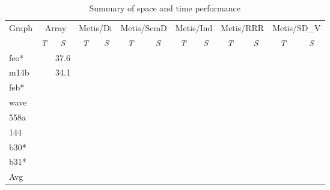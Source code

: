 \documentclass[12pt,glossary]{dalthesis}
\begin{document}
\begin{table}[]
\centering
\caption{Summary of space and time performance}
\label{my-label}
\begin{tabular}{|l||c|c||c|c||c|c||c|c||c|c||c|c|}
\hline
\multirow{2}{*}{Graph} & \multicolumn{2}{c||}{Array} & \multicolumn{2}{c||}{Metis/Di} & \multicolumn{2}{c||}{Metis/SemD} & \multicolumn{2}{c||}{Metis/Ind} & \multicolumn{2}{c||}{Metis/RRR} & \multicolumn{2}{c|}{Metis/SD\_V} \\ \cline{2-13}
                       & \textit{T}        & \textit{S}       & \textit{T}           & \textit{S}           & \textit{T} & \textit{S}          & \textit{T}            & \textit{S}           & \textit{T}          & \textit{S}        & \textit{T} & \textit{S} \\ \hline
feo*               &             & 37.6        &                &                 &               &                &                 &                  &               &               &                &                \\
m14b                   &             & 34.1        &                &                 &               &                &                 &                  &               &               &                &                \\
feb*               &             &             &                &                 &               &                &                 &                  &               &               &                &                \\
wave                   &             &             &                &                 &               &                &                 &                  &               &               &                &                \\
558a                   &             &             &                &                 &               &                &                 &                  &               &               &                &                \\
144                    &             &             &                &                 &               &                &                 &                  &               &               &                &                \\
b30*               &             &             &                &                 &               &                &                 &                  &               &               &                &                \\ 
b31*               &             &             &                &                 &               &                &                 &                  &               &               &                &                \\ \hline
Avg                    &             &             &                &                 &               &                &                 &                  &               &               &                &                \\ \hline


\end{tabular}
\end{table}
\end{document}
